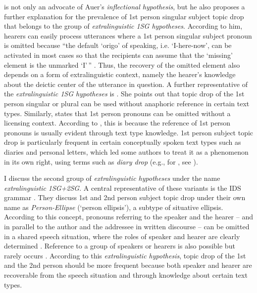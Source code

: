 \citet{imo2013, imo2014} is not only an advocate of Auer's \textit{inflectional hypothesis}, but he also proposes a further explanation for the prevalence of 1st person singular subject topic drop that belongs to the group of \textit{extralinguistic 1SG hypotheses}.
According to him, hearers can easily process utterances where a 1st person singular subject pronoun is omitted because ``the default `origo' of speaking, i.e. `I-here-now', can be activated in most cases so that the recipients can assume that the `missing' element is the unmarked `I'\,'' \citep[153--154]{imo2014}.
Thus, the recovery  of the omitted element also depends on a form of extralinguistic context, namely the hearer's knowledge about the deictic center of the utterance in question.
A further representative of the \textit{extralinguistic 1SG hypotheses} is \citet[272]{volodina2011}.
She points out that topic drop of the 1st person singular or plural can be used without anaphoric reference in certain text types. 
Similarly, \citet[4, footnote 1]{schalowski2015} states that 1st person pronouns can be omitted without a licensing context.
According to \citet[218]{volodina.onea2012}, this is because the reference of 1st person pronouns is usually evident through text type knowledge.
1st person subject topic drop is particularly frequent in certain conceptually spoken text types such as diaries and personal letters, which led some authors to treat it as a phenomenon in its own right, using terms such as \textit{diary drop} (e.g., \cite{haegeman1990} for , see \cite[272]{volodina2011}).

I discuss the second group of \textit{extralinguistic hypotheses} under the name \textit{extralinguistic} \textit{1SG+2SG}.
A central representative of these variants is the IDS grammar \citep[413]{zifonun.etal1997}.
They discuss 1st and 2nd person subject topic drop under their own name as \textit{Person-Ellipse} (`person ellipsis'), a subtype of situative ellipsis.
According to this concept, pronouns referring to the speaker and the hearer -- and in parallel to the author and the addressee in written discourse \citep[416]{zifonun.etal1997} -- can be omitted in a shared speech situation, where the roles of speaker and hearer are clearly determined \citep[414]{zifonun.etal1997}.
Reference to a group of speakers or hearers is also possible but rarely occurs \citep[415]{zifonun.etal1997}.
According to this \textit{extralinguistic hypothesis}, topic drop of the 1st and the 2nd person should be more frequent because both speaker and hearer are recoverable  from the speech situation and through knowledge about certain text types.

